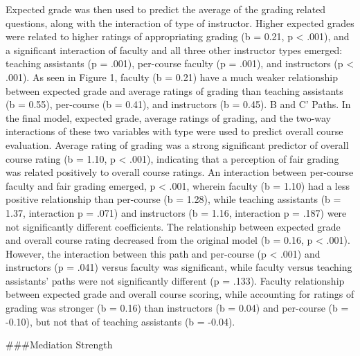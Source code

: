 \documentclass[man]{apa6}
\theoremstyle{definition}
\theoremstyle{definition}
\theoremstyle{definition}
\theoremstyle{remark}
\begin{document}
Expected grade was then used to predict the average of the grading
related questions, along with the interaction of type of instructor.
Higher expected grades were related to higher ratings of appropriating
grading (b = 0.21, p \textless{} .001), and a significant interaction of
faculty and all three other instructor types emerged: teaching
assistants (p = .001), per-course faculty (p = .001), and instructors (p
\textless{} .001). As seen in Figure 1, faculty (b = 0.21) have a much
weaker relationship between expected grade and average ratings of
grading than teaching assistants (b = 0.55), per-course (b = 0.41), and
instructors (b = 0.45). B and C' Paths. In the final model, expected
grade, average ratings of grading, and the two-way interactions of these
two variables with type were used to predict overall course evaluation.
Average rating of grading was a strong significant predictor of overall
course rating (b = 1.10, p \textless{} .001), indicating that a
perception of fair grading was related positively to overall course
ratings. An interaction between per-course faculty and fair grading
emerged, p \textless{} .001, wherein faculty (b = 1.10) had a less
positive relationship than per-course (b = 1.28), while teaching
assistants (b = 1.37, interaction p = .071) and instructors (b = 1.16,
interaction p = .187) were not significantly different coefficients. The
relationship between expected grade and overall course rating decreased
from the original model (b = 0.16, p \textless{} .001). However, the
interaction between this path and per-course (p \textless{} .001) and
instructors (p = .041) versus faculty was significant, while faculty
versus teaching assistants' paths were not significantly different (p =
.133). Faculty relationship between expected grade and overall course
scoring, while accounting for ratings of grading was stronger (b = 0.16)
than instructors (b = 0.04) and per-course (b = -0.10), but not that of
teaching assistants (b = -0.04).

\#\#\#Mediation Strength
\end{document}
